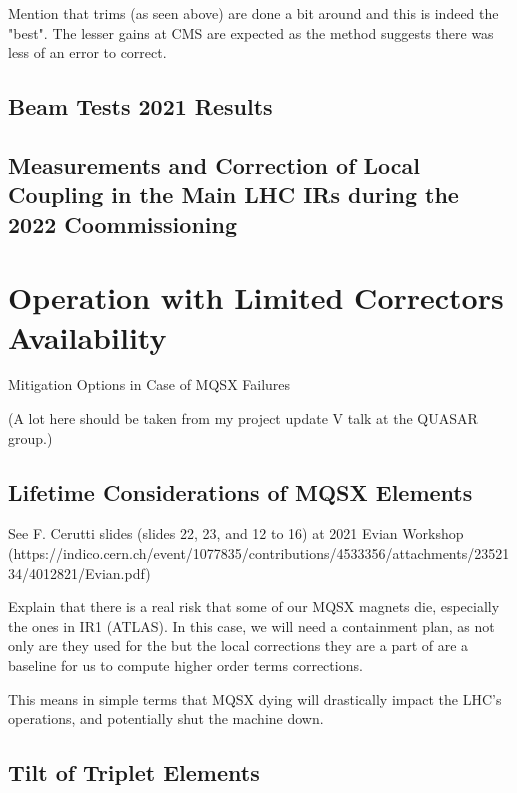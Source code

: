 Mention that trims (as seen above) are done a bit around and this is indeed the "best".
The lesser gains at CMS are expected as the method suggests there was less of an error to correct.

\subsection{Beam Tests \num{2021} Results}

\subsection{Measurements and Correction of Local Coupling in the Main LHC IRs during the \num{2022} Coommissioning}


\section{Operation with Limited Correctors Availability}

Mitigation Options in Case of MQSX Failures

(A lot here should be taken from my project update V talk at the QUASAR group.)

\subsection{Lifetime Considerations of MQSX Elements}

See F. Cerutti slides (slides 22, 23, and 12 to 16) at 2021 Evian Workshop
(https://indico.cern.ch/event/1077835/contributions/4533356/attachments/2352134/4012821/Evian.pdf)

Explain that there is a real risk that some of our MQSX magnets die, especially the ones in IR1 (ATLAS).
In this case, we will need a containment plan, as not only are they used for the but the local corrections they are a part of are a baseline for us to compute higher order terms corrections.


This means in simple terms that MQSX dying will drastically impact the LHC's operations, and potentially shut the machine down.

\subsection{Tilt of Triplet Elements}

